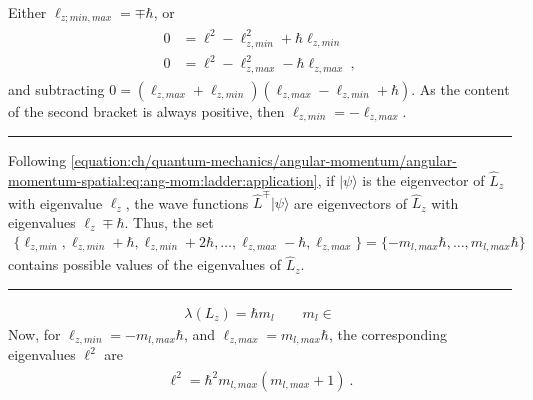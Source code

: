 \documentclass[letterpaper,10pt,english]{jupyterBook}
\begin{document}
\sphinxAtStartPar
Either \(\ell_{z;min,max} = \mp \hbar\), or
\begin{equation*}
\begin{split}\begin{aligned}
 0 & = \ell^2 - \ell_{z,min}^2 + \hbar \ell_{z,min}  \\
 0 & = \ell^2 - \ell_{z,max}^2 - \hbar \ell_{z,max} \ ,
\end{aligned}\end{split}
\end{equation*}
\sphinxAtStartPar
and subtracting \(0 = (\ell_{z,max} + \ell_{z,min})(\ell_{z,max} - \ell_{z,min} + \hbar )\). As the content of the second bracket is always positive, then \(\ell_{z,min} = - \ell_{z,max}\).


\bigskip\hrule\bigskip


\sphinxAtStartPar
Following \eqref{equation:ch/quantum-mechanics/angular-momentum/angular-momentum-spatial:eq:ang-mom:ladder:application}, if \(| \psi \rangle\) is the eigenvector of \(\hat{L}_z\) with eigenvalue \(\ell_z\), the wave functions \(\hat{L}^{\mp} | \psi \rangle\) are eigenvectors of \(\hat{L}_z\) with eigenvalues \(\ell_z \mp \hbar\). Thus, the set
\begin{equation*}
\begin{split}\{ \ell_{z,min}, \ell_{z,min} + \hbar, \ell_{z,min} + 2 \hbar, \dots, \ell_{z,max}-\hbar, \ell_{z,max} \} = \{ - m_{l,max} \hbar, \dots , m_{l,max} \hbar \} \end{split}
\end{equation*}
\sphinxAtStartPar
contains possible values of the eigenvalues of \(\hat{L}_z\).


\bigskip\hrule\bigskip

\begin{equation*}
\begin{split}\lambda\left(L_z\right) = \hbar m_l \qquad m_l \in \end{split}
\end{equation*}
\sphinxAtStartPar
Now, for \(\ell_{z,min} = -m_{l,max} \hbar\), and \(\ell_{z,max} = m_{l,max} \hbar\), the corresponding eigenvalues \(\ell^2\) are
\begin{equation*}
\begin{split}\begin{aligned}
  \ell^2 = \hbar^2 m_{l,max} \left( m_{l,max} + 1 \right) \ .
\end{aligned}\end{split}
\end{equation*}
\end{document}
